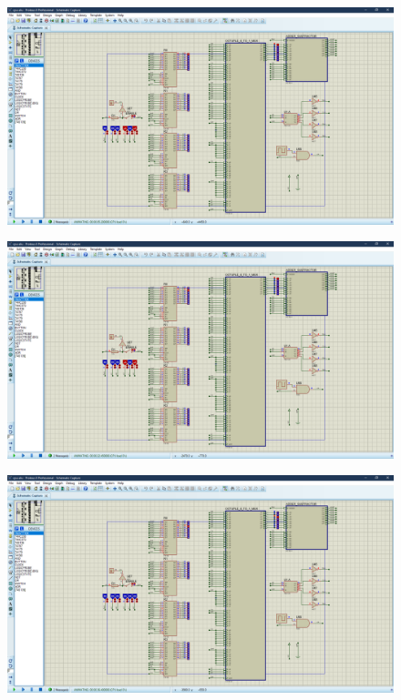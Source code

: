\documentclass[fleqn]{article}
\begin{document}
\begin{figure}[!htbp]
  \includegraphics[width=\textwidth]{Assets/t1.png}
  \caption{}
  \label{t1}
\end{figure}

\begin{figure}[!htbp]
  \includegraphics[width=\textwidth]{Assets/t2.png}
  \caption{}
  \label{t2}
\end{figure}

\begin{figure}[!htbp]
  \includegraphics[width=\textwidth]{Assets/t3.png}
  \caption{}
  \label{t3}
\end{figure}
\end{document}

